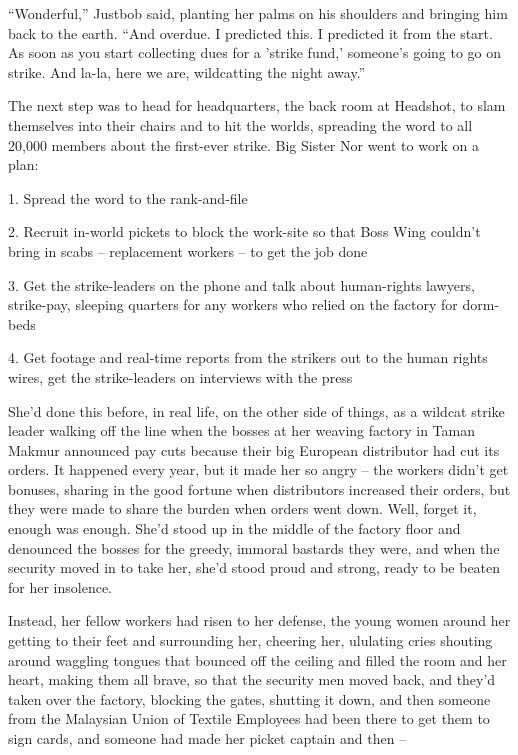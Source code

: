 ``Wonderful,'' Justbob said, planting her palms on his shoulders and
bringing him back to the earth. ``And overdue. I predicted this. I
predicted it from the start. As soon as you start collecting dues
for a 'strike fund,' someone's going to go on strike. And la-la,
here we are, wildcatting the night away.''

The next step was to head for headquarters, the back room at
Headshot, to slam themselves into their chairs and to hit the
worlds, spreading the word to all 20,000 members about the
first-ever strike. Big Sister Nor went to work on a plan:

1. Spread the word to the rank-and-file

2. Recruit in-world pickets to block the work-site so that Boss
Wing couldn't bring in scabs -- replacement workers -- to get the
job done

3. Get the strike-leaders on the phone and talk about human-rights
lawyers, strike-pay, sleeping quarters for any workers who relied
on the factory for dorm-beds

4. Get footage and real-time reports from the strikers out to the
human rights wires, get the strike-leaders on interviews with the
press

She'd done this before, in real life, on the other side of things,
as a wildcat strike leader walking off the line when the bosses at
her weaving factory in Taman Makmur announced pay cuts because
their big European distributor had cut its orders. It happened
every year, but it made her so angry -- the workers didn't get
bonuses, sharing in the good fortune when distributors increased
their orders, but they were made to share the burden when orders
went down. Well, forget it, enough was enough. She'd stood up in
the middle of the factory floor and denounced the bosses for the
greedy, immoral bastards they were, and when the security moved in
to take her, she'd stood proud and strong, ready to be beaten for
her insolence.

Instead, her fellow workers had risen to her defense, the young
women around her getting to their feet and surrounding her,
cheering her, ululating cries shouting around waggling tongues that
bounced off the ceiling and filled the room and her heart, making
them all brave, so that the security men moved back, and they'd
taken over the factory, blocking the gates, shutting it down, and
then someone from the Malaysian Union of Textile Employees had been
there to get them to sign cards, and someone had made her picket
captain and then --


